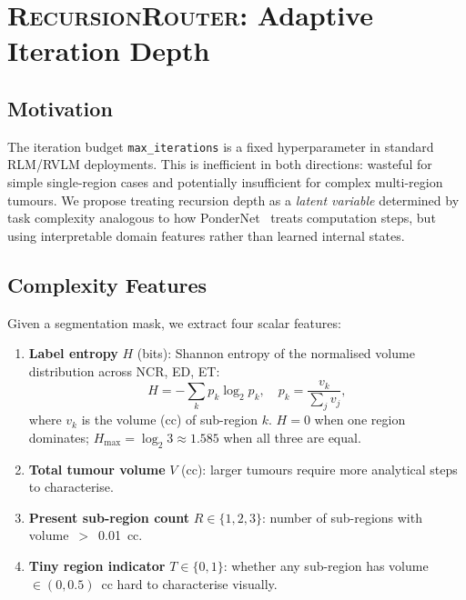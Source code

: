 \documentclass{article}
\newcommand{\RRouter}{\textsc{RecursionRouter}}
\begin{document}
	
	\section{\RRouter{}: Adaptive Iteration Depth}
	\label{sec:router}
	
	\subsection{Motivation}
	
	The iteration budget \texttt{max\_iterations} is a fixed hyperparameter in
	standard RLM/RVLM deployments.
	This is inefficient in both directions: wasteful for simple single-region
	cases and potentially insufficient for complex multi-region tumours.
	We propose treating recursion depth as a \emph{latent variable} determined
	by task complexity analogous to how PonderNet~\citep{banino2021pondernet}
	treats computation steps, but using interpretable domain features rather than
	learned internal states.
	
	\subsection{Complexity Features}
	
	Given a segmentation mask, we extract four scalar features:
	\begin{enumerate}[leftmargin=*,itemsep=2pt]
		\item \textbf{Label entropy} $H$ (bits): Shannon entropy of the normalised
		volume distribution across NCR, ED, ET:
		\begin{equation}
			H = -\sum_{k} p_k \log_2 p_k, \quad p_k = \frac{v_k}{\sum_j v_j},
			\label{eq:entropy}
		\end{equation}
		where $v_k$ is the volume (cc) of sub-region $k$.
		$H = 0$ when one region dominates; $H_{\max} = \log_2 3 \approx 1.585$
		when all three are equal.
		
		\item \textbf{Total tumour volume} $V$ (cc): larger tumours require more
		analytical steps to characterise.
		
		\item \textbf{Present sub-region count} $R \in \{1,2,3\}$: number of
		sub-regions with volume~$>$~0.01~cc.
		
		\item \textbf{Tiny region indicator} $T \in \{0,1\}$: whether any
		sub-region has volume $\in (0, 0.5)$~cc hard to characterise visually.
	\end{enumerate}
	
\end{document}

